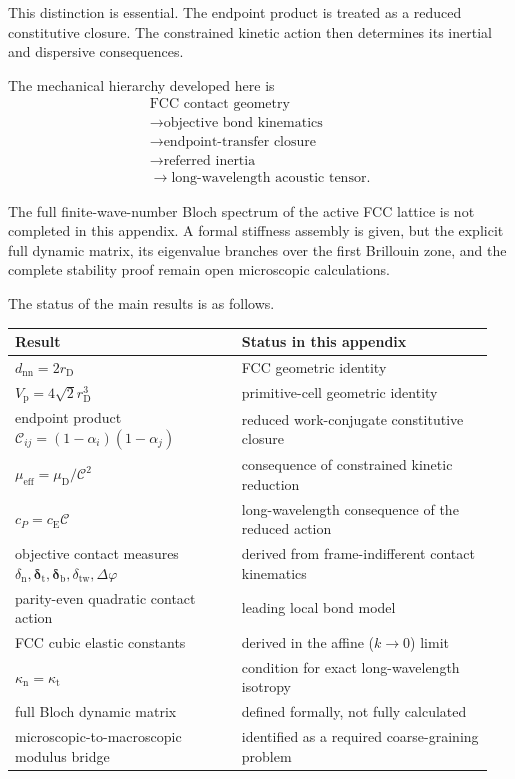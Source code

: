 This distinction is essential. The endpoint product is treated as a reduced constitutive closure. The constrained kinetic action then determines its inertial and dispersive consequences.

The mechanical hierarchy developed here is
\begin{equation}
\begin{array}{c}
    \text{FCC contact geometry} \\
    \longrightarrow \text{objective bond kinematics} \\
    \longrightarrow \text{endpoint-transfer closure} \\
    \longrightarrow \text{referred inertia} \\
    \longrightarrow \text{long-wavelength acoustic tensor}.
\end{array}
\end{equation}

The full finite-wave-number Bloch spectrum of the active FCC lattice is not completed in this appendix. A formal stiffness assembly is given, but the explicit full dynamic matrix, its eigenvalue branches over the first Brillouin zone, and the complete stability proof remain open microscopic calculations.

The status of the main results is as follows.

\begin{table}[h!]
\centering
\renewcommand{\arraystretch}{1.3}
\begin{tabular}{p{0.45\linewidth} p{0.5\linewidth}}
\hline
\textbf{Result} & \textbf{Status in this appendix} \\
\hline
$d_{\mathrm{nn}}=2r_{\mathrm{D}}$ & FCC geometric identity \\
$V_{\mathrm{p}}=4\sqrt{2}r_{\mathrm{D}}^3$ & primitive-cell geometric identity \\
endpoint product $\mathcal{C}_{ij}=(1-\alpha_i)(1-\alpha_j)$ & reduced work-conjugate constitutive closure \\
$\mu_{\mathrm{eff}}=\mu_{\mathrm{D}}/\mathcal{C}^2$ & consequence of constrained kinetic reduction \\
$c_P=c_{\mathrm{E}}\mathcal{C}$ & long-wavelength consequence of the reduced action \\
objective contact measures $\delta_{\mathrm{n}}, \boldsymbol{\delta}_{\mathrm{t}}, \boldsymbol{\delta}_{\mathrm{b}}, \delta_{\mathrm{tw}}, \Delta\varphi$ & derived from frame-indifferent contact kinematics \\
parity-even quadratic contact action & leading local bond model \\
FCC cubic elastic constants & derived in the affine ($k\rightarrow0$) limit \\
$\kappa_{\mathrm{n}}=\kappa_{\mathrm{t}}$ & condition for exact long-wavelength isotropy \\
full Bloch dynamic matrix & defined formally, not fully calculated \\
microscopic-to-macroscopic modulus bridge & identified as a required coarse-graining problem \\
\hline
\end{tabular}
\end{table}

